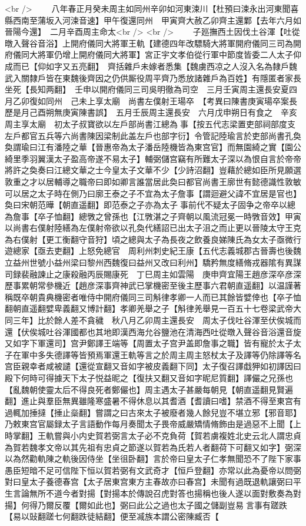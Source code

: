 <br />
　　八年春正月癸未周主如同州辛卯如河東涑川【杜預曰涑永出河東聞喜縣西南至蒲坂入河涑音速】甲午復還同州　甲寅齊大赦乙卯齊主還鄴【去年六月如晉陽今還】　二月辛酉周主命太<br />
<br />
　　子廵撫西土因伐土谷渾【吐從暾入聲谷音浴】上開府儀同大將軍王軌【建德四年改驃騎大將軍開府儀同三司為開府儀同大將軍仍增上開府儀同大將軍】宮正宇文孝伯從行軍中節度皆委二人太子仰成而已【仰如字又五亮翻】　齊括雜戶未嫁者悉集【魏虜西凉之人沒入名為隸戶魏武入關隸戶皆在東魏後齊因之仍供厮役周平齊乃悉放諸雜戶為百姓】有隱匿者家長坐死【長知两翻】　壬申以開府儀同三司吳明徹為司空　三月壬寅周主還長安夏四月乙卯復如同州　己未上享太廟　尚書左僕射王瑒卒　【考異曰陳書庚寅瑒卒案長歷是月己酉朔無庚寅陳書誤】　五月壬辰周主還長安　六月戊申朔日有食之　辛亥周主享太廟　初太子叔寶欲以左戶部尚書江總為事【按五代志梁置吏部祠部度支左戶都官五兵等六尚書陳因梁制此盖左戶也部字衍】令管記陸瑜言於吏部尚書孔奐奐謂瑜曰江有潘陸之華【晉惠帝為太子潘岳陸機皆為東宫官】而無園綺之實【園公綺里季羽翼漢太子盈高帝遂不易太子】輔弼儲宫竊有所難太子深以為恨自言於帝帝將許之奐奏曰江總文華之士今皇太子文華不少【少詩沼翻】豈藉於總如臣所見願選敦重之才以居輔導之職帝曰即如卿言誰當居此奐曰都官尚書王廓世有懿德識性敦敏可以居之太子時在側乃曰廓王泰之子不宜為太子詹事【謂迴避父諱不宜居是官也】奐曰宋朝范曄【朝直遥翻】即范泰之子亦為太子事前代不疑太子固争之帝卒以總為詹事【卒子恤翻】總斆之曾孫也【江斆湛之子齊朝以風流冠冕一時斆音效】甲寅以尚書右僕射陸繕為左僕射帝欲以孔奐代繕詔已出太子沮之而止更以晉陵太守王克為右僕射【更工衡翻守音狩】頃之總與太子為長夜之飲養良娣陳氏為女太子亟微行遊總家【亟去吏翻】上怒免總官　周利州刺史紀王康【五代志義城郡古晉壽也後魏立益州世號小益州梁曰黎州西魏復曰益州又改曰利州】驕矜無度繕脩戎器隂有異謀司録裴融諫止之康殺融丙辰賜康死　丁巳周主如雲陽　庚申齊宜陽王趙彦深卒彦深歷事累朝常參機近【趙彦深事齊神武已掌機密至後主歷事六君朝直遥翻】以温謹著稱既卒朝貴典機密者唯侍中開府儀同三司斛律孝卿一人而已其餘皆嬖倖也【卒子恤翻朝直遥翻嬖卑義翻又博計翻】孝卿羌舉之子【斛律羌舉見一百五十七卷梁武帝大同三年】比於餘人差不貪穢　秋八月乙卯周主還長安　周太子伐吐谷渾至伏俟城而還【伏俟城吐谷渾國都也其地即漢西海允谷鹽池在清海西吐從暾入聲谷音浴還音旋又如字下軍還司】宫尹鄭譯王端等【周置太子宫尹盖即詹事之職】皆有寵於太子太子在軍中多失德譯等皆預焉軍還王軌等言之於周主周主怒杖太子及譯等仍除譯等名宫臣親幸者咸被譴【還從宣翻又音如字被皮義翻下同】太子復召譯戱狎如初譯因曰殿下何時可得據天下太子悦益昵之【復扶又翻又音如字昵尼質翻】譯儼之兄孫也【亂魏朝使靈太后不得良死者鄭儼也】周主遇太子甚嚴每朝見【朝直遥翻見賢遍翻】進止與羣臣無異雖隆寒盛暑不得休息以其耆酒【耆讀曰嗜】禁酒不得至東宫有過輒加捶撻【捶止橤翻】嘗謂之曰古來太子被廢者幾人餘兒豈不堪立邪【邪音耶】乃敕東宫官屬録太子言語動作每月奏聞太子畏帝威嚴矯情脩飾由是過惡不上聞【上時掌翻】王軌嘗與小内史賀若弼言太子必不克負荷【賀若虜複姓北史云北人謂忠貞為賀若魏孝文帝以其先祖有忠貞之節遂以賀若為氏若人者翻荷下可翻又如字】弼深以為然勸軌陳之軌後因侍坐【坐徂卧翻】言於帝曰皇太子仁孝無聞恐不了陛下家事愚臣短暗不足可信陛下恒以賀若弼有文武奇才【恒戶登翻】亦常以此為憂帝以問弼對曰皇太子養德春宫【太子居東宫東方主春故亦曰春宫】未聞有過既退軌讓弼曰平生言論無所不道今者對揚【對揚本於傳說召虎對答也揚稱也後人遂以面對敷奏為對揚】何得乃爾反覆【爾如此也】弼曰此公之過也太子國之儲副豈易言事有蹉跌【易以䜴翻蹉七何翻跌徒結翻】便至㓕族本謂公密陳臧否【
